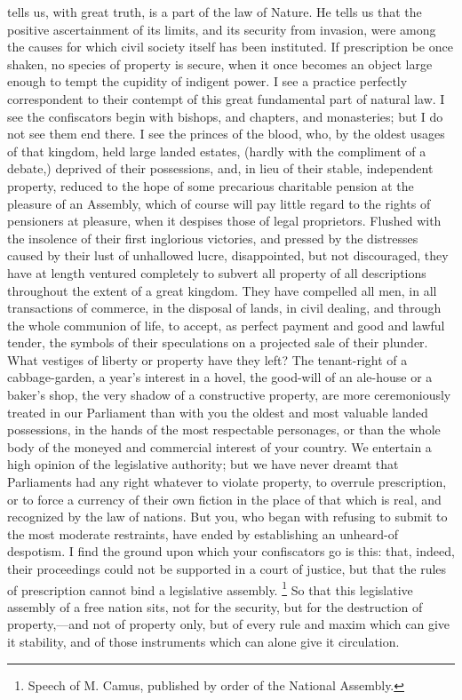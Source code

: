  tells us, with great truth, is a part of the law of Nature. He tells us that the positive ascertainment of its limits, and its security from invasion, were among the causes for which civil society itself has been instituted. If prescription be once shaken, no species of property is secure, when it once becomes an object large enough to tempt the cupidity of indigent power. I see a practice perfectly correspondent to their contempt of this great fundamental part of natural law. I see the confiscators begin with bishops, and chapters, and monasteries; but I do not see them end there. I see the princes of the blood, who, by the oldest usages of that kingdom, held large landed estates, (hardly with the compliment of a debate,) deprived of their possessions, and, in lieu of their stable, independent property, reduced to the hope of some precarious charitable pension at the pleasure of an Assembly, which of course will pay little regard to the rights of pensioners at pleasure, when it despises those of legal proprietors. Flushed with the insolence of their first inglorious victories, and pressed by the distresses caused by their lust of unhallowed lucre, disappointed, but not discouraged, they have at length ventured completely to subvert all property of all descriptions throughout the extent of a great kingdom. They have compelled all men, in all transactions of commerce, in the disposal of lands, in civil dealing, and through the whole communion of life, to accept, as perfect payment and good and lawful tender, the symbols of their speculations on a projected sale of their plunder. What vestiges of liberty or property have they left? The tenant-right of a cabbage-garden, a year's interest in a hovel, the good-will of an ale-house or a baker's shop, the very shadow of a constructive property, are more ceremoniously treated in our Parliament than with you the oldest and most valuable landed possessions, in the hands of the most respectable personages, or than the whole body of the moneyed and commercial interest of your country. We entertain a high opinion of the legislative authority; but we have never dreamt that Parliaments had any right whatever to violate property, to overrule prescription, or to force a currency of their own fiction in the place of that which is real, and recognized by the law of nations. But you, who began with refusing to submit to the most moderate restraints, have ended by establishing an unheard-of despotism. I find the ground upon which your confiscators go is this: that, indeed, their proceedings could not be supported in a court of justice, but that the rules of prescription cannot bind a legislative assembly.
\footnote{ Speech of M. Camus, published by order of the National Assembly.}
 So that this legislative assembly of a free nation sits, not for the security, but for the destruction of property,—and not of property only, but of every rule and maxim which can give it stability, and of those instruments which can alone give it circulation.

